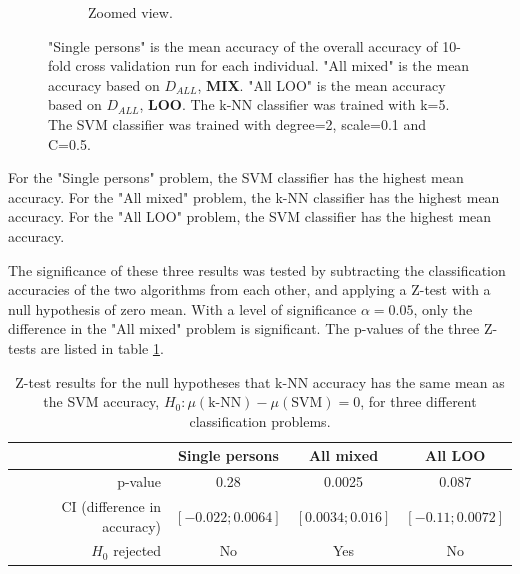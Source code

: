 \begin{figure}[h]
\begin{subfigure}{\figscale}
\caption[k-NN and SVM classification accuracies, zoomed view.]
{
Zoomed view.
}
\label{fig:knn-vs-svm-zoomed}
\end{subfigure}
\caption[k-NN and SVM classification accuracies]{
"Single persons" is the mean accuracy of the overall accuracy of 10-fold cross validation run for each individual.
"All mixed" is the mean accuracy based on $D_{ALL}$, \textbf{MIX}.
"All LOO" is the mean accuracy based on $D_{ALL}$, \textbf{LOO}.
The k-NN classifier was trained with k=5. The SVM classifier was trained with degree=2, scale=0.1 and C=0.5.
}
\end{figure}

For the "Single persons" problem, the SVM classifier has the highest mean accuracy.
For the "All mixed" problem, the k-NN classifier has the highest mean accuracy.
For the "All LOO" problem, the SVM classifier has the highest mean accuracy.

The significance of these three results was tested by subtracting the classification
accuracies of the two algorithms from each other,
and applying a Z-test with a null hypothesis of zero mean.
With a level of significance \(\alpha=0.05\),
only the difference in the "All mixed" problem is significant.
The p-values of the three Z-tests are listed in table \ref{tb:ztest}.
\begin{table}[h]
\centering
\caption[Z-test results]
{
Z-test results for the null hypotheses that k-NN accuracy has
the same mean as the SVM accuracy, \(H_0:\mu\left(\text{k-NN}\right)-\mu\left(\text{SVM}\right)=0\), for three different classification problems.
}
\begin{tabular}{|r||c|c|c|}
\hline
 & Single persons & All mixed & All LOO
 \\
 \hline
p-value & 0.28 & 0.0025 & 0.087
\\
CI (difference in accuracy)& \(\left[-0.022;0.0064\right]\)
& \(\left[0.0034;0.016\right]\)
& \(\left[-0.11;0.0072\right]\)
\\
\(H_0\) rejected & No & Yes & No
\\
\hline
\end{tabular}
\label{tb:ztest}
\end{table}

